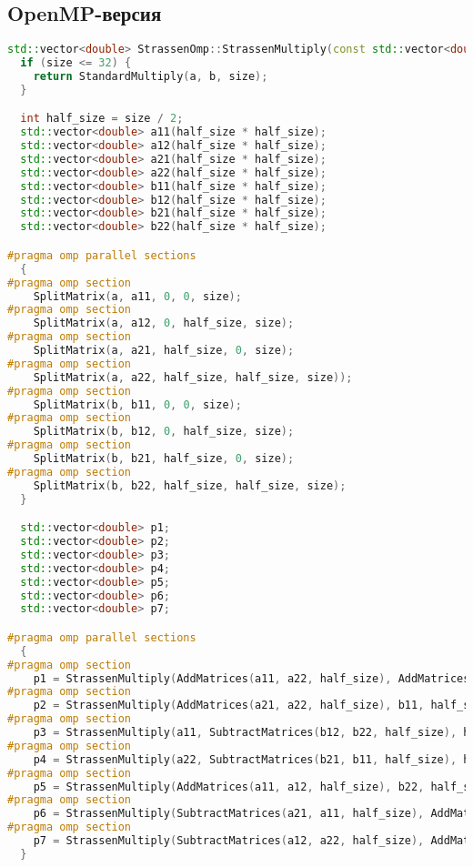 \documentclass[14pt,a4paper]{extarticle}
\begin{document}
\subsection{OpenMP-версия}
\begin{lstlisting}[language=C++]
std::vector<double> StrassenOmp::StrassenMultiply(const std::vector<double>& a, const std::vector<double>& b, int size) {
  if (size <= 32) {
    return StandardMultiply(a, b, size);
  }

  int half_size = size / 2;
  std::vector<double> a11(half_size * half_size);
  std::vector<double> a12(half_size * half_size);
  std::vector<double> a21(half_size * half_size);
  std::vector<double> a22(half_size * half_size);
  std::vector<double> b11(half_size * half_size);
  std::vector<double> b12(half_size * half_size);
  std::vector<double> b21(half_size * half_size);
  std::vector<double> b22(half_size * half_size);

#pragma omp parallel sections
  {
#pragma omp section
    SplitMatrix(a, a11, 0, 0, size);
#pragma omp section
    SplitMatrix(a, a12, 0, half_size, size);
#pragma omp section
    SplitMatrix(a, a21, half_size, 0, size);
#pragma omp section
    SplitMatrix(a, a22, half_size, half_size, size));
#pragma omp section
    SplitMatrix(b, b11, 0, 0, size);
#pragma omp section
    SplitMatrix(b, b12, 0, half_size, size);
#pragma omp section
    SplitMatrix(b, b21, half_size, 0, size);
#pragma omp section
    SplitMatrix(b, b22, half_size, half_size, size);
  }

  std::vector<double> p1;
  std::vector<double> p2;
  std::vector<double> p3;
  std::vector<double> p4;
  std::vector<double> p5;
  std::vector<double> p6;
  std::vector<double> p7;

#pragma omp parallel sections
  {
#pragma omp section
    p1 = StrassenMultiply(AddMatrices(a11, a22, half_size), AddMatrices(b11, b22, half_size), half_size);
#pragma omp section
    p2 = StrassenMultiply(AddMatrices(a21, a22, half_size), b11, half_size);
#pragma omp section
    p3 = StrassenMultiply(a11, SubtractMatrices(b12, b22, half_size), half_size);
#pragma omp section
    p4 = StrassenMultiply(a22, SubtractMatrices(b21, b11, half_size), half_size);
#pragma omp section
    p5 = StrassenMultiply(AddMatrices(a11, a12, half_size), b22, half_size);
#pragma omp section
    p6 = StrassenMultiply(SubtractMatrices(a21, a11, half_size), AddMatrices(b11, b12, half_size), half_size);
#pragma omp section
    p7 = StrassenMultiply(SubtractMatrices(a12, a22, half_size), AddMatrices(b21, b22, half_size), half_size);
  }


\end{lstlisting}
\end{document}
